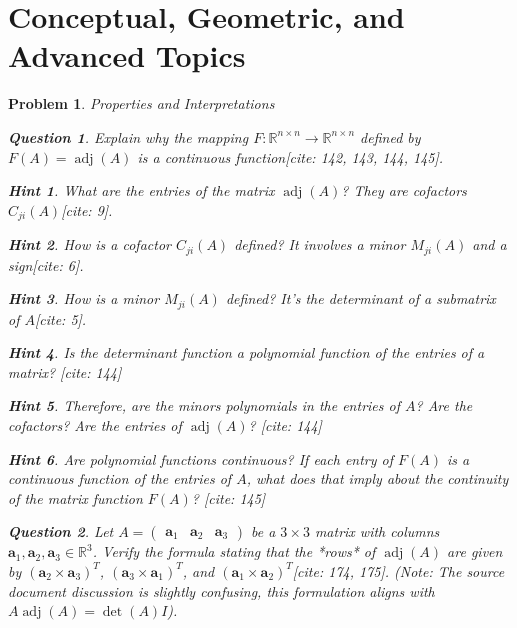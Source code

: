 \documentclass[12pt]{article}
\newtheorem{problem}{Problem}[section]
\newtheorem{question}{Question}[problem]
\theoremstyle{definition}
\newtheorem{hint}{Hint}[question]
\newcommand{\adj}{\operatorname{adj}}
\newcommand{\R}{\mathbb{R}}
\begin{document}
\section{Conceptual, Geometric, and Advanced Topics}

\begin{problem}{Properties and Interpretations}
    \begin{question}
        Explain why the mapping $F: \R^{n \times n} \to \R^{n \times n}$ defined by $F(A) = \adj(A)$ is a continuous function[cite: 142, 143, 144, 145].
    \end{question}
    
        \begin{hint}
            What are the entries of the matrix $\adj(A)$? They are cofactors $C_{ji}(A)$[cite: 9].
        \end{hint}
        \begin{hint}
            How is a cofactor $C_{ji}(A)$ defined? It involves a minor $M_{ji}(A)$ and a sign[cite: 6].
        \end{hint}
        \begin{hint}
            How is a minor $M_{ji}(A)$ defined? It's the determinant of a submatrix of $A$[cite: 5].
        \end{hint}
        \begin{hint}
            Is the determinant function a polynomial function of the entries of a matrix? [cite: 144]
        \end{hint}
        \begin{hint}
            Therefore, are the minors polynomials in the entries of $A$? Are the cofactors? Are the entries of $\adj(A)$? [cite: 144]
        \end{hint}
        \begin{hint}
            Are polynomial functions continuous? If each entry of $F(A)$ is a continuous function of the entries of $A$, what does that imply about the continuity of the matrix function $F(A)$? [cite: 145]
        \end{hint}
    

    \begin{question}
        Let $A = \begin{pmatrix} \mathbf{a}_1 & \mathbf{a}_2 & \mathbf{a}_3 \end{pmatrix}$ be a $3 \times 3$ matrix with columns $\mathbf{a}_1, \mathbf{a}_2, \mathbf{a}_3 \in \R^3$. Verify the formula stating that the *rows* of $\adj(A)$ are given by $(\mathbf{a}_2 \times \mathbf{a}_3)^T$, $(\mathbf{a}_3 \times \mathbf{a}_1)^T$, and $(\mathbf{a}_1 \times \mathbf{a}_2)^T$[cite: 174, 175]. (Note: The source document discussion is slightly confusing, this formulation aligns with $A \adj(A) = \det(A)I$).
    \end{question}
    

\end{problem}
\end{document}
